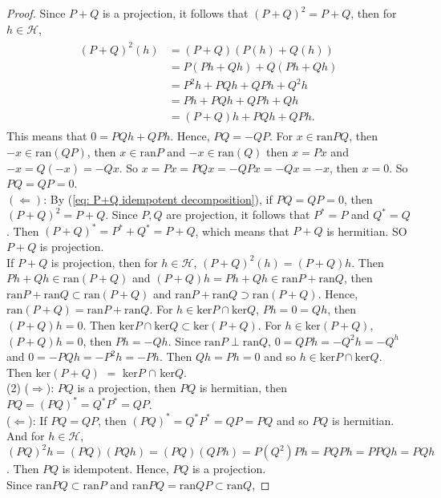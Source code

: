 \begin{proof}
    Since $P+Q$ is a projection, it follows that $(P+Q)^2=P+Q$, then for $h\in\mathscr{H}$,
    \begin{align}
        \begin{aligned}
            (P+Q)^2(h)&= (P+Q)(P(h)+Q(h))\\
                  &= P(Ph+Qh) + Q(Ph+Qh)\\
                  &= P^2h + PQh + QPh+ Q^2h\\
                  &= Ph + PQh + QPh+Qh\\
                  &= (P+Q)h+ PQh+QPh.
        \end{aligned}
        \label{eq: P+Q idempotent decomposition}
    \end{align}
    This means that $0=PQh+QPh$. Hence, $PQ=-QP$.
    For $x\in \text{ran} PQ$, then $-x\in \text{ran}(QP)$, then $x\in \text{ran}P$ and $-x\in \text{ran}(Q)$ 
    then $x=Px$ and $-x=Q(-x)=-Qx$.
    So $x=Px=PQx=-QPx=-Qx=-x$, then $x=0$. So $PQ=QP=0$.\\
    $(\Leftarrow)$: By (\ref{eq: P+Q idempotent decomposition}), if $PQ=QP=0$,
    then $(P+Q)^2=P+Q$. Since $P,Q$ are projection, it follows that $P^*=P$ and $Q^*=Q$.
    Then $(P+Q)^*=P^*+Q^*=P+Q$, which means that $P+Q$ is hermitian. SO $P+Q$ is projection.\\
    If $P+Q$ is projection, then for $h\in \mathscr{H}$, $(P+Q)^2(h)=(P+Q)h$. Then
    $Ph+Qh\in \text{ran}(P+Q)$ and $(P+Q)h=Ph+Qh\in \text{ran}P+\text{ran}Q$, then
    $\text{ran}P+\text{ran}Q\subset \text{ran}(P+Q)$ and $\text{ran}P+\text{ran}Q\supset \text{ran}(P+Q)$.
    Hence, $\text{ran}(P+Q)=\text{ran}P+\text{ran}Q$.
    For $h\in \text{ker}P\cap \text{ker}Q$, $Ph=0=Qh$, then $(P+Q)h=0$. Then $\text{ker}P\cap \text{ker}Q\subset \text{ker}(P+Q)$.
    For $h\in \text{ker}(P+Q)$, $(P+Q)h=0$, then $Ph=-Qh$. Since $\text{ran}P\perp \text{ran}Q$, $0=QPh=-Q^2h=-Q^h$ and $0=-PQh=-P^2h=-Ph$.
    Then $Qh=Ph=0$ and so $h\in \text{ker}P\cap \text{ker}Q$. 
    Then ker$(P+Q)$ $=$ ker$P$ $\cap$ ker$Q$.\\
    (2) 
    ($\Rightarrow$): $PQ$ is a projection, then $PQ$ is hermitian, then
    $PQ=(PQ)^*=Q^*P^*=QP$.\\
    ($\Leftarrow$): If $PQ=QP$, then
    $(PQ)^*=Q^*P^*=QP=PQ$ and so $PQ$ is hermitian.
    And for $h\in\mathscr{H}$, $(PQ)^2h=(PQ)(PQh)=(PQ)(QPh)=P(Q^2)Ph=PQPh=PPQh=PQh$.
    Then $PQ$ is idempotent.
    Hence, $PQ$ is a projection.\\
    Since $\text{ran}PQ\subset \text{ran}P$ and $\text{ran}PQ=\text{ran}QP\subset \text{ran}Q$,

\end{proof}
